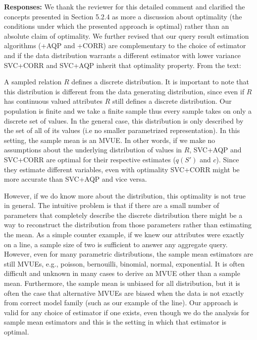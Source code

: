 \vspace{.25em}

{\bf Responses:} We thank the reviewer for this detailed comment and clarified the concepts presented in Section 5.2.4 as more a discussion about optimality (the conditions under which the presented approach is optimal) rather than an absolute claim of optimality. We further revised that our query result estimation algorithms (\svcnospace+AQP and \svcnospace+CORR) are complementary to the choice of estimator and if the data distribution warrants a different estimator with lower variance SVC+CORR and SVC+AQP inherit that optimality property. From the text:  
\begin{displayquote}A sampled relation $R$ defines a discrete distribution. It is important to note that this distribution is different from the data generating distribution, since even if $R$ has continuous valued attributes $R$ still defines a discrete distribution. Our population is finite and we take a finite sample thus every sample takes on only a discrete set of values. In the general case, this distribution is only described by the set of all of its values (i.e no smaller parametrized representation). In this setting, the sample mean is an MVUE. In other words, if we make no assumptions about the underlying distribution of values in $R$, SVC+AQP and SVC+CORR are optimal for their respective estimates ($q(S')$ and $c$). Since they estimate different variables, even with optimality SVC+CORR might be more accurate than SVC+AQP and vice versa. 

However, if we do know more about the distribution, this optimality is not true in general. The intuitive problem is that if there are a small number of parameters that completely describe the discrete distribution there might be a way to reconstruct the distribution from those parameters rather than estimating the mean. As a simple counter example, if we knew our attributes were exactly on a line, a sample size of two is sufficient to answer any aggregate query. However, even for many parametric distributions, the sample mean estimators are still MVUEs, e.g., poisson, bernouilli, binomial, normal, exponential. It is often difficult and unknown in many cases to derive an MVUE other than a sample mean. Furthermore, the sample mean is unbiased for all distribution, but it is often the case that alternative MVUEs are biased when the data is not exactly from correct model family (such as our example of the line). Our approach is valid for any choice of estimator if one exists, even though we do the analysis for sample mean estimators and this is the setting in which that estimator is optimal.\end{displayquote}



